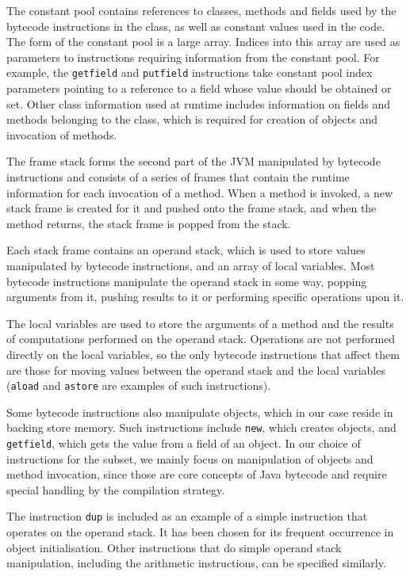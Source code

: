 The constant pool contains references to classes, methods and fields
used by the bytecode instructions in the class, as well as constant
values used in the code.
The form of the constant pool is a large array.
Indices into this array are used as parameters to instructions
requiring information from the constant pool.
For example, the \texttt{getfield} and \texttt{putfield} instructions
take constant pool index parameters pointing to a reference to a field
whose value should be obtained or set.
Other class information used at runtime includes information on fields
and methods belonging to the class, which is required for creation of
objects and invocation of methods.

The frame stack forms the second part of the JVM manipulated by
bytecode instructions and consists of a series of frames that contain
the runtime information for each invocation of a method.
When a method is invoked, a new stack frame is created for it and
pushed onto the frame stack, and when the method returns, the stack
frame is popped from the stack.

Each stack frame contains an operand stack, which is used to store
values manipulated by bytecode instructions, and an array of local
variables.
Most bytecode instructions manipulate the operand stack in some way,
popping arguments from it, pushing results to it or performing
specific operations upon it.

The local variables are used to store the arguments of a method and
the results of computations performed on the operand stack.
Operations are not performed directly on the local variables, so the
only bytecode instructions that affect them are those for moving
values between the operand stack and the local variables
(\texttt{aload} and \texttt{astore} are examples of such
instructions).

Some bytecode instructions also manipulate objects, which in our case
reside in backing store memory.
Such instructions include \texttt{new}, which creates objects, and
\texttt{getfield}, which gets the value from a field of an object.
In our choice of instructions for the subset, we mainly focus on
manipulation of objects and method invocation, since those are core
concepts of Java bytecode and require special handling by the
compilation strategy.

The instruction \texttt{dup} is included as an example of a simple
instruction that operates on the operand stack.
It has been chosen for its frequent occurrence in object initialisation.
Other instructions that do simple operand stack manipulation,
including the arithmetic instructions, can be specified similarly.


